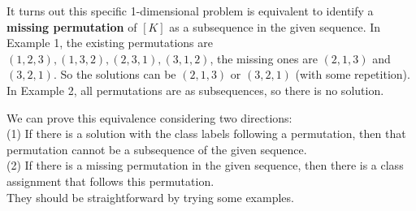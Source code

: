 \documentclass{article}
\newcommand{\calS}{{\mathcal{S}}}
\newcommand{\calC}{\mathcal{C}}
\begin{document}
It turns out this specific 1-dimensional problem is equivalent to identify a \textbf{missing permutation} of $[K]$ as a subsequence in the given sequence. In Example 1, the existing permutations are $(1,2,3), (1,3,2), (2,3,1), (3,1,2)$, the missing ones are $(2,1,3)$ and $(3,2,1)$.  So the solutions can be $(2,1,3)$ or $(3,2,1)$ (with some repetition). In Example 2, all permutations are as subsequences, so there is no solution. 

We can prove this equivalence considering two directions: \\
(1) If there is a solution with the class labels following a permutation, then that permutation cannot be a subsequence of the given sequence. \\
(2) If there is a missing permutation in the given sequence, then there is a class assignment that follows this permutation.\\ 
They should be straightforward by trying some examples. 


\end{document}
